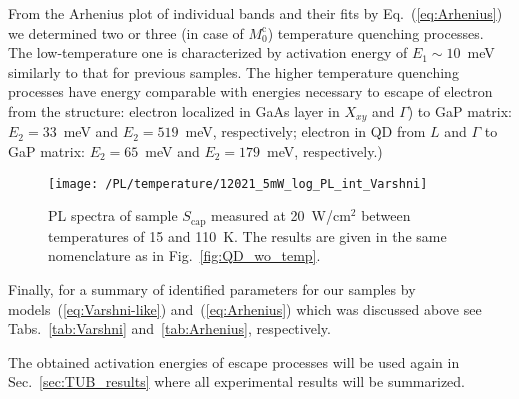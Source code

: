 From the Arhenius plot of individual bands and their fits by Eq.~(\ref{eq:Arhenius}) we determined two or three (in case of $M_0^\mathrm{c}$) temperature quenching processes. The low-temperature one is characterized by activation energy of $E_1\sim 10$~meV similarly to that for previous samples. The higher temperature quenching processes have energy comparable with energies necessary to escape of electron from the structure: electron localized in GaAs layer in $X_{xy}$ and $\Gamma$) to GaP matrix: $E_2=33$~meV and $E_2=519$~meV, respectively; electron in QD from $L$ and $\Gamma$ to GaP matrix: $E_2=65$~meV and $E_2=179$~meV, respectively.)

%
\begin{figure}[h]
	\centering
	\texttt{[image: /PL/temperature/12021\_5mW\_log\_PL\_int\_Varshni]}
	\caption{PL spectra of sample ${S_\mathrm{cap}}$ measured at 20~W/cm$^2$ between temperatures of 15 and 110~K. The results are given in the same nomenclature as in Fig.~\ref{fig:QD_wo_temp}.}
	\label{fig:QD_c_temp}
\end{figure}


%



Finally, for a summary of identified parameters for our samples by models~(\ref{eq:Varshni-like}) and~(\ref{eq:Arhenius}) which was discussed above see Tabs.~\ref{tab:Varshni} and~\ref{tab:Arhenius}, respectively. 

The obtained activation energies of escape processes will be used again in Sec.~\ref{sec:TUB_results} where all experimental results will be summarized.




